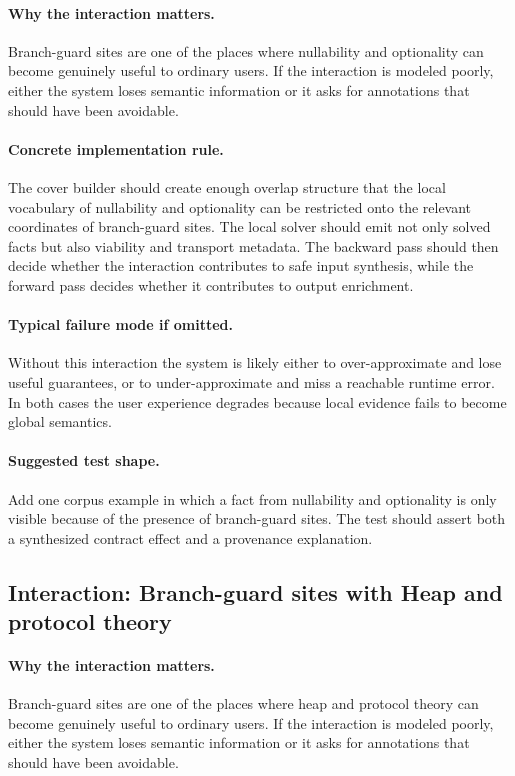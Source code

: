 \documentclass[11pt]{report}
\theoremstyle{definition}
\theoremstyle{plain}
\begin{document}
\paragraph{Why the interaction matters.}
Branch-guard sites are one of the places where nullability and optionality can become
genuinely useful to ordinary users. If the interaction is modeled poorly,
either the system loses semantic information or it asks for annotations that
should have been avoidable.

\paragraph{Concrete implementation rule.}
The cover builder should create enough overlap structure that the local
vocabulary of nullability and optionality can be restricted onto the relevant
coordinates of branch-guard sites. The local solver should emit not only
solved facts but also viability and transport metadata. The backward pass
should then decide whether the interaction contributes to safe input
synthesis, while the forward pass decides whether it contributes to output
enrichment.

\paragraph{Typical failure mode if omitted.}
Without this interaction the system is likely either to over-approximate and
lose useful guarantees, or to under-approximate and miss a reachable runtime
error. In both cases the user experience degrades because local evidence
fails to become global semantics.

\paragraph{Suggested test shape.}
Add one corpus example in which a fact from nullability and optionality is only
visible because of the presence of branch-guard sites. The test should
assert both a synthesized contract effect and a provenance explanation.

\subsection{Interaction: Branch-guard sites with Heap and protocol theory}

\paragraph{Why the interaction matters.}
Branch-guard sites are one of the places where heap and protocol theory can become
genuinely useful to ordinary users. If the interaction is modeled poorly,
either the system loses semantic information or it asks for annotations that
should have been avoidable.
\end{document}
